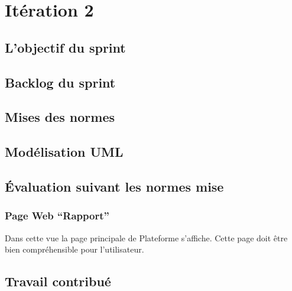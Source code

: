 \section{Itération 2}

\subsection{L'objectif du sprint}
\subsection{Backlog du sprint}
\subsection{Mises des normes}
\subsection{Modélisation UML}
\subsection{Évaluation suivant les normes mise}
\subsubsection{Page Web ``Rapport''}
Dans cette vue la page principale de Plateforme s'affiche. Cette page doit être
bien compréhensible pour l'utilisateur.

\subsection{Travail contribué}